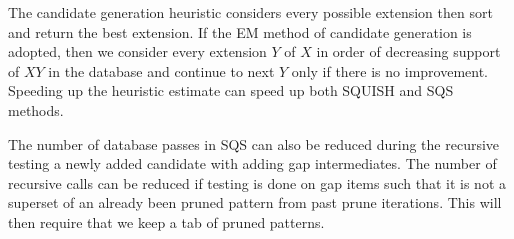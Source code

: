 \documentclass[10pt]{article}
\begin{document}
\par The candidate generation heuristic considers every possible extension then sort and return the best extension. If the EM method of candidate generation is adopted, then we consider every extension $Y$ of $X$ in order of decreasing support of $XY$ in the database and continue to next $Y$ only if there is no improvement. Speeding up the heuristic estimate can speed up both SQUISH and SQS methods.         

\par The number of database passes in SQS can also be reduced during the recursive testing a newly added candidate with adding gap intermediates. The number of recursive calls can be reduced if testing is done on gap items such that it is not a superset of an already been pruned pattern from past prune iterations. This will then require that we keep a tab of pruned patterns. 



\end{document}
